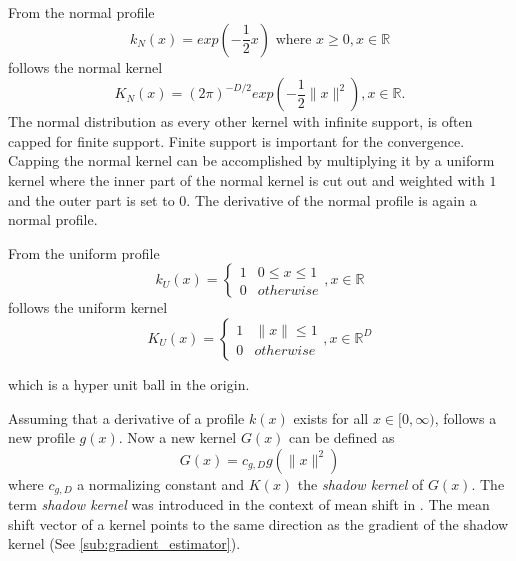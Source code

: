 From the normal profile
\begin{equation}\label{eq:nml}
  k_N(x) = exp \left( - \frac{1}{2} x \right) \textrm{ where } x \geq 0, x \in \mathbb{R}
\end{equation}
follows the normal kernel
\begin{equation}\label{eq:nmlk}
  K_N(x) = (2\pi)^{-D/2}exp\left( -\frac{1}{2} \lVert x \rVert^2 \right), x \in \mathbb{R}.
\end{equation}
The normal distribution as every other kernel with infinite support,
is often capped for finite support. Finite support is important for
the convergence. Capping the normal kernel can be accomplished by
multiplying it by a uniform kernel where the inner part of the normal
kernel is cut out and weighted with $1$ and the outer part is set to
$0$. The derivative of the normal profile is again a normal profile.

From the uniform profile
\begin{equation}\label{eq:unf}
  k_U(x) = \begin{cases}
    1 &  0 \leq x \leq 1\\
    0 & \mathit{otherwise}
  \end{cases}, x \in \mathbb{R}
\end{equation}
follows the uniform kernel
\begin{equation}\label{eq:unfk}
  K_U(x) = \begin{cases}
    1 &  \lVert x \rVert  \leq 1\\
    0 & \mathit{otherwise}
  \end{cases}, x \in \mathbb{R}^D
\end{equation}

which is a hyper unit ball in the origin.

Assuming that a derivative of a profile $k(x)$ exists for all $x \in
[0, \infty)$, follows a new profile $g(x)$. Now a new kernel $G(x)$
can be defined as
\begin{equation}\label{eq:shadowk}
  G(x) = c_{g,D}g(\lVert x \rVert^2)
\end{equation}
where $c_{g,D}$ a normalizing constant and $K(x)$ the \emph{shadow
  kernel} of $G(x)$. The term \emph{shadow kernel} was introduced in
the context of mean shift in \citep{citeulike:2522867}. The mean shift
vector of a kernel points to the same direction as the gradient of the
shadow kernel (See \autoref{sub:gradient_estimator}).



